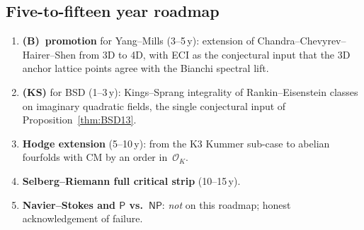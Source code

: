 \documentclass[11pt,a4paper]{article}
\theoremstyle{definition}
\newcommand{\OK}{\mathcal{O}_K}
\begin{document}
\begin{center}
\end{center}

\subsection{Five-to-fifteen year roadmap}
\begin{enumerate}[label=(\arabic*),leftmargin=2em]
  \item \textbf{(B)~promotion} for Yang--Mills (3--5\,y): extension of
        Chandra--Chevyrev--Hairer--Shen from 3D to 4D, with
        ECI as the conjectural input that the 3D anchor lattice points
        agree with the Bianchi spectral lift.
  \item \textbf{(KS)} for BSD (1--3\,y): Kings--Sprang
        integrality of Rankin--Eisenstein classes on imaginary
        quadratic fields, the single conjectural input of
        Proposition~\ref{thm:BSD13}.
  \item \textbf{Hodge extension} (5--10\,y): from the K3 Kummer
        sub-case to abelian fourfolds with CM by an order
        in~$\OK$.
  \item \textbf{Selberg--Riemann full critical strip} (10--15\,y).
  \item \textbf{Navier--Stokes and $\mathsf{P}$ vs.\ $\mathsf{NP}$}:
        \emph{not} on this roadmap; honest acknowledgement of failure.
\end{enumerate}
\end{document}
